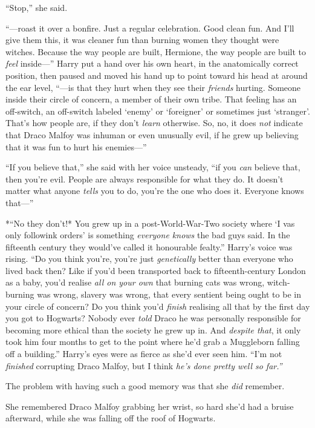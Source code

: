 ``Stop,'' she said.

``---roast it over a bonfire. Just a regular celebration. Good clean
fun. And I'll give them this, it was cleaner fun than burning women they
thought were witches. Because the way people are built, Hermione, the
way people are built to \emph{feel} inside---'' Harry put a hand over
his own heart, in the anatomically correct position, then paused and
moved his hand up to point toward his head at around the ear level,
``---is that they hurt when they see their \emph{friends} hurting.
Someone inside their circle of concern, a member of their own tribe.
That feeling has an off-switch, an off-switch labeled `enemy' or
`foreigner' or sometimes just `stranger'. That's how people are, if they
don't \emph{learn} otherwise. So, no, it does \emph{not} indicate that
Draco Malfoy was inhuman or even unusually evil, if he grew up believing
that it was fun to hurt his enemies---''

``If you believe that,'' she said with her voice unsteady, ``if you
\emph{can} believe that, then you're evil. People are always responsible
for what they do. It doesn't matter what anyone \emph{tells} you to do,
you're the one who does it. Everyone knows that---''

*``No they don't!* You grew up in a post-World-War-Two society where `I
vas only followink orders' is something \emph{everyone knows} the bad
guys said. In the fifteenth century they would've called it honourable
fealty.'' Harry's voice was rising. ``Do you think you're, you're just
\emph{genetically} better than everyone who lived back then? Like if
you'd been transported back to fifteenth-century London as a baby, you'd
realise \emph{all on your own} that burning cats was wrong,
witch-burning was wrong, slavery was wrong, that every sentient being
ought to be in your circle of concern? Do you think you'd \emph{finish}
realising all that by the first day you got to Hogwarts? Nobody ever
\emph{told} Draco he was personally responsible for becoming more
ethical than the society he grew up in. And \emph{despite that}, it only
took him four months to get to the point where he'd grab a Muggleborn
falling off a building.'' Harry's eyes were as fierce as she'd ever seen
him. ``I'm not \emph{finished} corrupting Draco Malfoy, but I think
\emph{he's done pretty well so far.''}

The problem with having such a good memory was that she \emph{did}
remember.

She remembered Draco Malfoy grabbing her wrist, so hard she'd had a
bruise afterward, while she was falling off the roof of Hogwarts.

